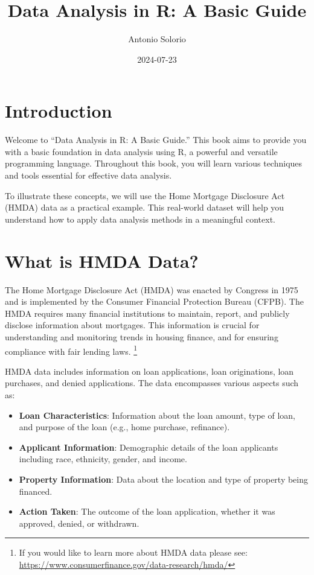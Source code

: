 \documentclass[
]{book}
\title{Data Analysis in R: A Basic Guide}
\author{Antonio Solorio}
\date{2024-07-23}
\providecommand{\tightlist}{%
  \setlength{\itemsep}{0pt}\setlength{\parskip}{0pt}}
\begin{document}
\maketitle

{
\setcounter{tocdepth}{1}
\tableofcontents
}
\hypertarget{introduction}{%
\chapter*{Introduction}\label{introduction}}

Welcome to ``Data Analysis in R: A Basic Guide.'' This book aims to provide you with a basic foundation in data analysis using R, a powerful and versatile programming language. Throughout this book, you will learn various techniques and tools essential for effective data analysis.

To illustrate these concepts, we will use the Home Mortgage Disclosure Act (HMDA) data as a practical example. This real-world dataset will help you understand how to apply data analysis methods in a meaningful context.

\hypertarget{what-is-hmda-data}{%
\chapter{What is HMDA Data?}\label{what-is-hmda-data}}

The Home Mortgage Disclosure Act (HMDA) was enacted by Congress in 1975 and is implemented by the Consumer Financial Protection Bureau (CFPB). The HMDA requires many financial institutions to maintain, report, and publicly disclose information about mortgages. This information is crucial for understanding and monitoring trends in housing finance, and for ensuring compliance with fair lending laws. \footnote{If you would like to learn more about HMDA data please see: \url{https://www.consumerfinance.gov/data-research/hmda/}}

HMDA data includes information on loan applications, loan originations, loan purchases, and denied applications. The data encompasses various aspects such as:

\begin{itemize}
\tightlist
\item
  \textbf{Loan Characteristics}: Information about the loan amount, type of loan, and purpose of the loan (e.g., home purchase, refinance).
\item
  \textbf{Applicant Information}: Demographic details of the loan applicants including race, ethnicity, gender, and income.
\item
  \textbf{Property Information}: Data about the location and type of property being financed.
\item
  \textbf{Action Taken}: The outcome of the loan application, whether it was approved, denied, or withdrawn.
\end{itemize}
\end{document}
